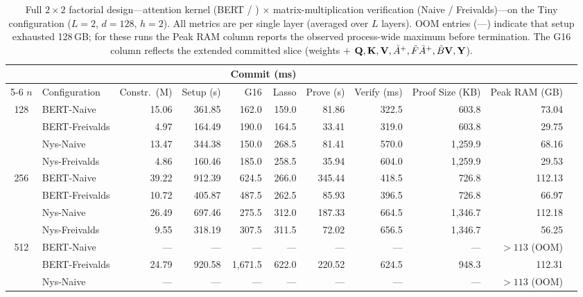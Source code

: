 \documentclass[sigconf,anonymous,review,balance=false]{acmart}
\newcommand{\rev}[1]{{\color{magenta}#1}}
\begin{document}
\begin{table}[!ht]
\centering
\caption{Full $2{\times}2$ factorial design---attention kernel (BERT / \nystrom) $\times$ matrix-multiplication verification (Naive / Freivalds)---on the Tiny configuration ($L{=}2$, $d{=}128$, $h{=}2$). All metrics are per single layer (averaged over $L$ layers). OOM entries (---) indicate that setup exhausted 128\,GB; for these runs the Peak RAM column reports the observed process-wide maximum before termination. \rev{The G16 column reflects the extended committed slice (weights $+$ ${\mathbf{Q}}, {\mathbf{K}}, {\mathbf{V}}, \tilde{A}^{+}, \tilde{F}\tilde{A}^{+}, \tilde{B}{\mathbf{V}}, {\mathbf{Y}}$).}}
\label{tab:master}
\small
\setlength{\tabcolsep}{3pt}
\begin{tabular}{@{} cl rrrrrrrrr @{}}
\toprule
 & & & & \multicolumn{2}{c}{Commit (ms)} & & & & \\
\cmidrule(lr){5-6}
$n$ & Configuration & Constr.\ (M) & Setup (s) & G16 & Lasso & Prove (s) & Verify (ms) & Proof Size (KB) & Peak RAM (GB) \\
\midrule
\multirow{4}{*}{128}
  & BERT-Naive     & 15.06 & 361.85 & 162.0 & 159.0 & 81.86  & 322.5 & 603.8      & 73.04 \\
  & BERT-Freivalds & 4.97  & 164.49 & 190.0 & 164.5 & 33.41  & 319.0 & 603.8      & 29.75 \\
  & Nys-Naive      & 13.47 & 344.38 & 150.0 & 268.5 & 81.41  & 570.0 & 1{,}259.9  & 68.16 \\
  & Nys-Freivalds  & 4.86  & 160.46 & 185.0 & 258.5 & 35.94  & 604.0 & 1{,}259.9  & 29.53 \\
\midrule
\multirow{4}{*}{256}
  & BERT-Naive     & 39.22 & 912.39 & 624.5 & 266.0 & 345.44 & 418.5 & 726.8      & 112.13 \\
  & BERT-Freivalds & 10.72 & 405.87 & 487.5 & 262.5 & 85.93  & 396.5 & 726.8      & 66.97 \\
  & Nys-Naive      & 26.49 & 697.46 & 275.5 & 312.0 & 187.33 & 664.5 & 1{,}346.7  & 112.18 \\
  & Nys-Freivalds  & 9.55  & 318.19 & 307.5 & 311.5 & 72.02  & 656.5 & 1{,}346.7  & 56.25 \\
\midrule
\multirow{4}{*}{512}
  & BERT-Naive     & ---   & ---    & ---       & ---   & ---    & ---   & ---        & ${>}113$ (OOM) \\
  & BERT-Freivalds & 24.79 & 920.58 & 1{,}671.5 & 622.0 & 220.52 & 624.5 & 948.3     & 112.31 \\
  & Nys-Naive      & ---   & ---    & ---       & ---   & ---    & ---   & ---        & ${>}113$ (OOM) \\

\end{tabular}
\end{table}
\end{document}
